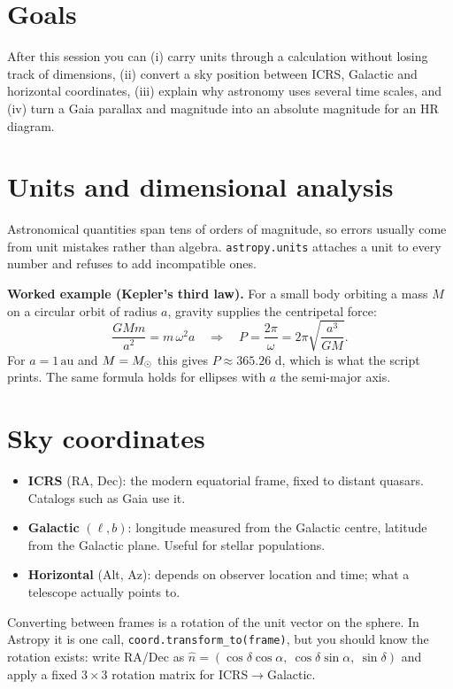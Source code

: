 


\section*{Goals}
After this session you can (i) carry units through a calculation without losing track of dimensions, (ii) convert a sky position between ICRS, Galactic and horizontal coordinates, (iii) explain why astronomy uses several time scales, and (iv) turn a Gaia parallax and magnitude into an absolute magnitude for an HR diagram.

\section{Units and dimensional analysis}
Astronomical quantities span tens of orders of magnitude, so errors usually come from unit mistakes rather than algebra. \texttt{astropy.units} attaches a unit to every number and refuses to add incompatible ones.

\begin{keyidea}
\textbf{Worked example (Kepler's third law).} For a small body orbiting a mass $M$ on a circular orbit of radius $a$, gravity supplies the centripetal force:
\[
\frac{GMm}{a^2} = m\,\omega^2 a
\quad\Rightarrow\quad
P = \frac{2\pi}{\omega} = 2\pi\sqrt{\frac{a^3}{GM}} .
\]
For $a = 1\,\mathrm{au}$ and $M=M_\odot$ this gives $P\approx 365.26$ d, which is what the script prints. The same formula holds for ellipses with $a$ the semi-major axis.
\end{keyidea}

\section{Sky coordinates}
\begin{itemize}
\item \textbf{ICRS} (RA, Dec): the modern equatorial frame, fixed to distant quasars. Catalogs such as Gaia use it.
\item \textbf{Galactic} $(\ell, b)$: longitude measured from the Galactic centre, latitude from the Galactic plane. Useful for stellar populations.
\item \textbf{Horizontal} (Alt, Az): depends on observer location and time; what a telescope actually points to.
\end{itemize}
Converting between frames is a rotation of the unit vector on the sphere. In Astropy it is one call, \texttt{coord.transform\_to(frame)}, but you should know the rotation exists: write RA/Dec as
$\hat n = (\cos\delta\cos\alpha,\ \cos\delta\sin\alpha,\ \sin\delta)$ and apply a fixed $3\times3$ rotation matrix for ICRS$\to$Galactic.

